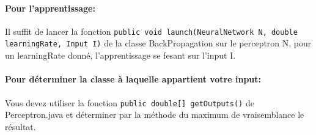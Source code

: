 \documentclass[a4paper,twoside]{report}
\begin{document}
\paragraph*{Pour l'apprentissage: } Il suffit de lancer la fonction \texttt{public void launch(NeuralNetwork N, double learningRate, Input I)} de la classe BackPropagation sur le perceptron N, pour un learningRate donné, l'apprentissage se fesant sur l'input I.  

\paragraph*{Pour déterminer la classe à laquelle appartient votre input:} Vous devez utiliser la fonction \texttt{public double[] getOutputs()} de Perceptron.java et déterminer par la méthode du maximum de vraisemblance le résultat.
\end{document}
